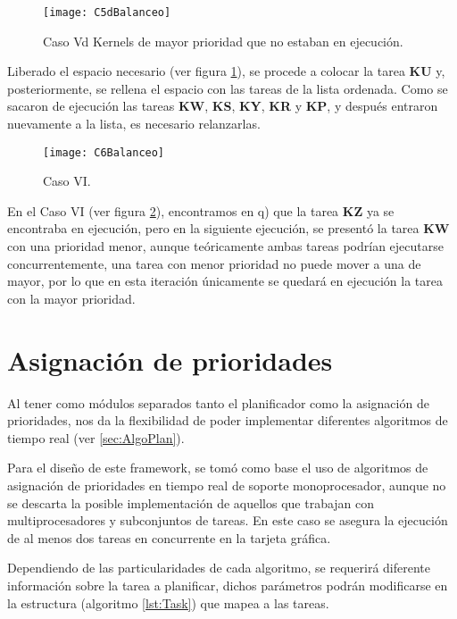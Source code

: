     \begin{figure}[!]
      \centering
        \texttt{[image: C5dBalanceo]}
        \caption{Caso Vd Kernels de mayor prioridad que no estaban en ejecución.}
        \label{fig:C5dBalanceo}
    \end{figure}

   Liberado el espacio necesario (ver figura  \ref{fig:C5dBalanceo}), se procede a colocar la tarea \textbf{KU} y, posteriormente, se rellena el espacio con las tareas de la lista ordenada. Como se sacaron de ejecución las tareas \textbf{KW}, \textbf{KS}, \textbf{KY}, \textbf{KR} y \textbf{KP}, y después entraron nuevamente a la lista, es necesario relanzarlas.
\newline

    \begin{figure}[!]
      \centering
        \texttt{[image: C6Balanceo]}
        \caption{Caso VI.}
        \label{fig:C6Balanceo}
    \end{figure}
    En el Caso VI (ver figura  \ref{fig:C6Balanceo}), encontramos en q) que la tarea \textbf{KZ} ya se encontraba en ejecución, pero en la siguiente ejecución, se presentó la tarea \textbf{KW} con una prioridad menor, aunque teóricamente ambas tareas podrían ejecutarse concurrentemente, una tarea con menor prioridad no puede mover a una de mayor, por lo que en esta iteración únicamente se quedará en ejecución la tarea con la mayor prioridad.
    
\section{Asignación de prioridades} \label{secc:asigPrioridad}

Al tener como módulos separados tanto el planificador como la asignación de prioridades, nos da la flexibilidad de poder implementar diferentes algoritmos de tiempo real (ver \ref{sec:AlgoPlan}).
\newline

Para el diseño de este framework, se tomó como base el uso de algoritmos de asignación de prioridades en tiempo real de soporte monoprocesador, aunque no se descarta la posible implementación de aquellos que trabajan con multiprocesadores y subconjuntos de tareas. En este caso se asegura la ejecución de al menos dos tareas en concurrente en la tarjeta gráfica.
\newline

Dependiendo de las particularidades de cada algoritmo, se requerirá diferente información sobre la tarea a planificar, dichos parámetros podrán modificarse en la estructura (algoritmo \ref{lst:Task}) que mapea a las tareas.
\newline

